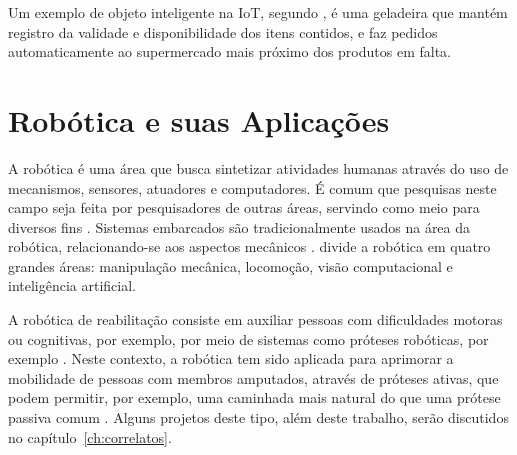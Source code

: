 
Um exemplo de objeto inteligente na IoT, segundo , é uma geladeira que mantém registro da validade e disponibilidade dos itens contidos, e faz pedidos automaticamente ao supermercado mais próximo dos produtos em falta.


\section{Robótica e suas Aplicações}
\label{sec:robotica}

A robótica é uma área que busca sintetizar atividades humanas através do uso de mecanismos, sensores, atuadores e computadores. É comum que pesquisas neste campo seja feita por pesquisadores de outras áreas, servindo como meio para diversos fins \cite{craig:2005}. Sistemas embarcados são tradicionalmente usados na área da robótica, relacionando-se aos aspectos mecânicos \cite{marwedel:2010}.  divide a robótica em quatro grandes áreas: manipulação mecânica, locomoção, visão computacional e inteligência artificial.



A robótica de reabilitação consiste em auxiliar pessoas com dificuldades motoras ou cognitivas, por exemplo, por meio de sistemas como próteses robóticas, por exemplo \cite{siciliano:2008}. Neste contexto, a robótica tem sido aplicada para aprimorar a mobilidade de pessoas com membros amputados, através de próteses ativas, que podem permitir, por exemplo, uma caminhada mais natural do que uma prótese passiva comum \cite{dedic:2011}. Alguns projetos deste tipo, além deste trabalho, serão discutidos no capítulo~\ref{ch:correlatos}.



